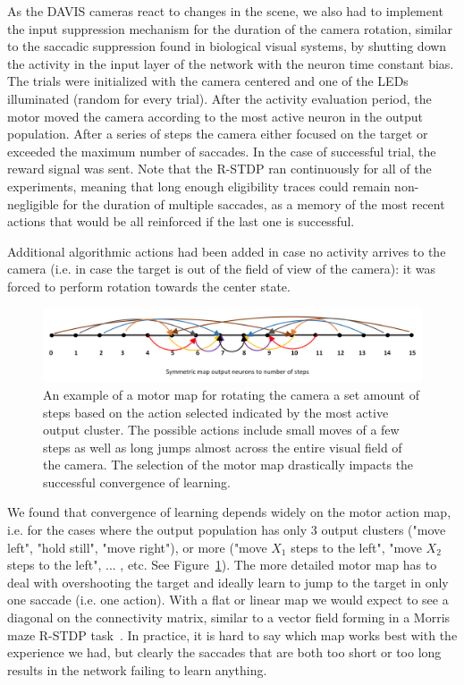 As the DAVIS cameras react to changes in the scene, we also had to implement the input suppression mechanism for the duration of the camera rotation, similar to the saccadic suppression found in biological visual systems, by shutting down the activity in the input layer of the network with the neuron time constant bias.\\

The trials were initialized with the camera centered and one of the LEDs illuminated (random for every trial). After the activity evaluation period, the motor moved the camera according to the most active neuron in the output population. After a series of steps the camera either focused on the target or exceeded the maximum number of saccades. In the case of successful trial, the reward signal was sent. Note that the R-STDP ran continuously for all of the experiments, meaning that long enough eligibility traces could remain non-negligible for the duration of multiple saccades, as a memory of the most recent actions that would be all reinforced if the last one is successful.

Additional algorithmic actions had been added in case no activity arrives to the camera (i.e. in case the target is out of the field of view of the camera): it was forced to perform rotation towards the center state.\\

\begin{figure}[h!]
  \centering
    \includegraphics[width=\linewidth]{img/chapter5/camera_motor_map.png}
    \caption[Camera motor map]{An example of a motor map for rotating the camera a set amount of steps based on the action selected indicated by the most active output cluster. The possible actions include small moves of a few steps as well as long jumps almost across the entire visual field of the camera. The selection of the motor map drastically impacts the successful convergence of learning.}
  \label{fig:camera_motor_map}
\end{figure}

We found that convergence of learning depends widely on the motor action map, i.e. for the cases where the output population has only 3 output clusters ("move left", "hold still", "move right"), or more ("move $X_1$ steps to the left", "move $X_2$ steps to the left", ... , etc. See Figure~\ref{fig:camera_motor_map}). The more detailed motor map has to deal with overshooting the target and ideally learn to jump to the target in only one saccade (i.e. one action). With a flat or linear map we would expect to see a diagonal on the connectivity matrix, similar to a vector field forming in a Morris maze R-STDP task~\cite{Vasilaki09}. In practice, it is hard to say which map works best with the experience we had, but clearly the saccades that are both too short or too long results in the network failing to learn anything.\\

